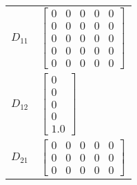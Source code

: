 \begin{tabular}{cl}
 $D_{11}$ & $\left[\begin{matrix}0 & 0 & 0 & 0 & 0\\0 & 0 & 0 & 0 & 0\\0 & 0 & 0 & 0 & 0\\0 & 0 & 0 & 0 & 0\\0 & 0 & 0 & 0 & 0\end{matrix}\right]$                                                                 \\
 $D_{12}$ & $\left[\begin{matrix}0\\0\\0\\0\\1.0\end{matrix}\right]$                                                                                                                                               \\
 $D_{21}$ & $\left[\begin{matrix}0 & 0 & 0 & 0 & 0\\0 & 0 & 0 & 0 & 0\\0 & 0 & 0 & 0 & 0\end{matrix}\right]$                                                                                                       \\
\hline
\end{tabular}